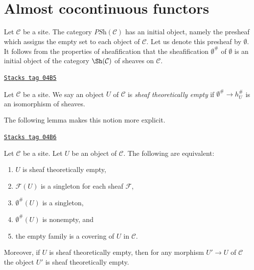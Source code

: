 \section{Almost cocontinuous functors}
\label{sites-section-almost-cocontinuous}
Let $\mathcal{C}$ be a site. The category $\textit{PSh}(\mathcal{C})$ has
an initial object, namely the presheaf which assigns the empty set
to each object of $\mathcal{C}$. Let us denote this presheaf by
$\emptyset$. It follows from the properties of sheafification that the
sheafification $\emptyset^\#$ of $\emptyset$ is an initial object
of the category $\Sh(\mathcal{C})$ of sheaves on $\mathcal{C}$.

\begin{definition}[Empty]
\label{sites-definition-empty}
\href{https://stacks.math.columbia.edu/tag/04B5}{\texttt{Stacks tag 04B5}}

Let $\mathcal{C}$ be a site. We say an object $U$ of $\mathcal{C}$
is {\it sheaf theoretically empty} if $\emptyset^\# \to h_U^\#$
is an isomorphism of sheaves.
\end{definition}

The following lemma makes this notion more explicit.

\begin{lemma}
\label{sites-lemma-characterize-empty}
\href{https://stacks.math.columbia.edu/tag/04B6}{\texttt{Stacks tag 04B6}}

Let $\mathcal{C}$ be a site. Let $U$ be an object of $\mathcal{C}$.
The following are equivalent:
\begin{enumerate}
\item $U$ is sheaf theoretically empty,
\item $\mathcal{F}(U)$ is a singleton for each sheaf $\mathcal{F}$,
\item $\emptyset^\#(U)$ is a singleton,
\item $\emptyset^\#(U)$ is nonempty, and
\item the empty family is a covering of $U$ in $\mathcal{C}$.
\end{enumerate}
Moreover, if $U$ is sheaf theoretically empty, then for any morphism
$U' \to U$ of $\mathcal{C}$ the object $U'$ is sheaf theoretically empty.
\end{lemma}


